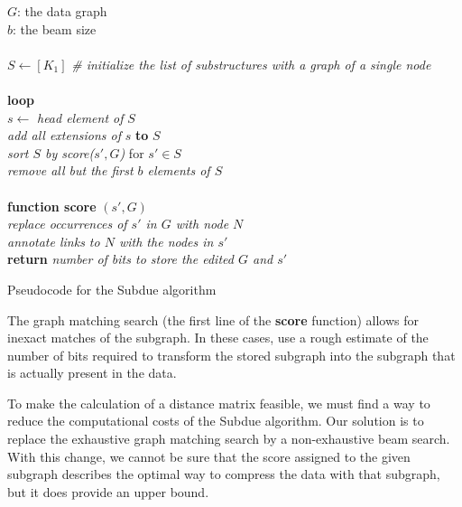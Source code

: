 \documentclass{article}
\begin{document}
\begin{pseudo}[h]
{
	$G$: the data graph \\
	$b$: the beam size \\
	\\
	$S \leftarrow [K_1]$ \textit{\#  initialize the list of substructures with a graph of a single node} \\
	\\
	\textbf{loop} \\
	\hspace*{5mm} $s \leftarrow $ \textit{head element of} $S$ \\
	\hspace*{5mm} \textit{add all extensions of} $s$ \textbf{to} $S$ \\
	
	\hspace*{5mm}\textit{sort $S$ by score($s', G$)} for $s' \in S$\\
	\hspace*{5mm}\textit{remove all but the first $b$ elements of $S$} \\
	\\
	\textbf{function score} $(s', G)$\\
	\hspace*{5mm} \textit{replace occurrences of $s'$ in $G$ with node $N$}\\
	\hspace*{5mm} \textit{annotate links to $N$ with the nodes in $s'$}\\
	\hspace*{5mm} \textbf{return} \textit{number of bits to store the edited $G$ and $s'$ }\\
}
	\caption{Pseudocode for the Subdue algorithm}
\end{pseudo}

The graph matching search (the first line of the \textbf{score} function) allows for inexact matches of the subgraph. In these cases, use a rough estimate of the number of bits required to transform the stored subgraph into the subgraph that is actually present in the data.

To make the calculation of a distance matrix feasible, we must find a way to reduce the computational costs of the Subdue algorithm. Our solution is to replace the exhaustive graph matching search by a non-exhaustive beam search. With this change, we cannot be sure that the score assigned to the given subgraph describes the optimal way to compress the data with that subgraph, but it does provide an upper bound. 
\end{document}
